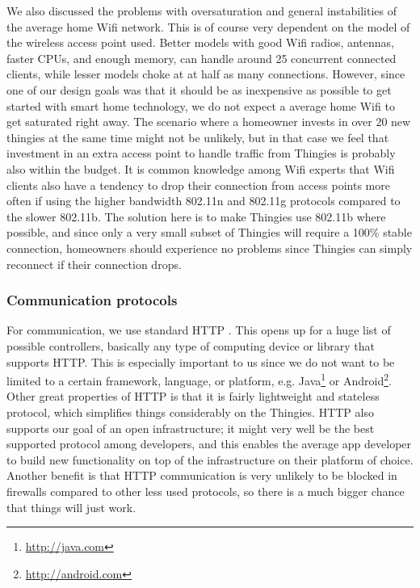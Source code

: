 \documentclass{ubicomp2012}
\begin{document}
We also discussed the problems with oversaturation and general instabilities of the average home Wifi network. This is of course very dependent on the model of the wireless access point used. Better models with good Wifi radios, antennas, faster CPUs, and enough memory, can handle around 25 concurrent connected clients, while lesser models choke at at half as many connections. However, since one of our design goals was that it should be as inexpensive as possible to get started with smart home technology, we do not expect a average home Wifi to get saturated right away. The scenario where a homeowner invests in over 20 new thingies at the same time might not be unlikely, but in that case we feel that investment in an extra access point to handle traffic from Thingies is probably also within the budget. It is common knowledge among Wifi experts that Wifi clients also have a tendency to drop their connection from access points more often if using the higher bandwidth 802.11n and 802.11g protocols compared to the slower 802.11b. The solution here is to make Thingies use 802.11b where possible, and since only a very small subset of Thingies will require a 100\% stable connection, homeowners should experience no problems since Thingies can simply reconnect if their connection drops.

\subsubsection{Communication protocols}

For communication, we use standard HTTP \cite{Fielding:1999:HTP:RFC2616}. This opens up for a huge list of possible controllers, basically any type of computing device or library that supports HTTP. This is especially important to us since we do not want to be limited to a certain framework, language, or platform, e.g. Java\footnote{\url{http://java.com}} or Android\footnote{\url{http://android.com}}. Other great properties of HTTP is that it is fairly lightweight and stateless protocol, which simplifies things considerably on the Thingies. HTTP also supports our goal of an open infrastructure; it might very well be the best supported protocol among developers, and this enables the average app developer to build new functionality on top of the infrastructure on their platform of choice. Another benefit is that HTTP communication is very unlikely to be blocked in firewalls compared to other less used protocols, so there is a much bigger chance that things will just work.
\end{document}
